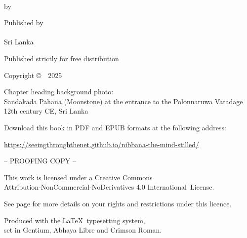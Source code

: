 \cleartoverso
\thispagestyle{empty}

{\copyrightsize
\centering
\setlength{\parindent}{0pt}%
\setlength{\parskip}{0.8\baselineskip}%

\thetitle\\
\thesubtitle

\ifthenelse{\equal{}{\theVolumeTitle}}{}{\textbf{\theVolumeTitle}}{}

by \theauthor

Published by\\
\thePublisher\\
Sri Lanka

Published strictly for free distribution


Copyright \copyright\ \thePublisher\ 2025

Chapter heading background photo:\\
Sandakada Pahana (Moonstone) at the entrance to the Polonnaruwa Vatadage\\
12th century CE, Sri Lanka

Download this book in PDF and EPUB formats at the following address:

\href{https://seeingthroughthenet.github.io/nibbana-the-mind-stilled/}{https://seeingthroughthenet.github.io/nibbana-the-mind-stilled/}

\vfill

{\LARGE -- PROOFING COPY --}

\vfill

{\footnotesize

This work is licensed under a Creative Commons\\
Attribution-NonCommercial-NoDerivatives 4.0 International~License.

See page \pageref{copyright-details} for more details on your rights and restrictions under this licence.

Produced with the \LaTeX\ typesetting system,\\ set in Gentium, Abhaya Libre and Crimson Roman.

\theEditionInfo

}}
